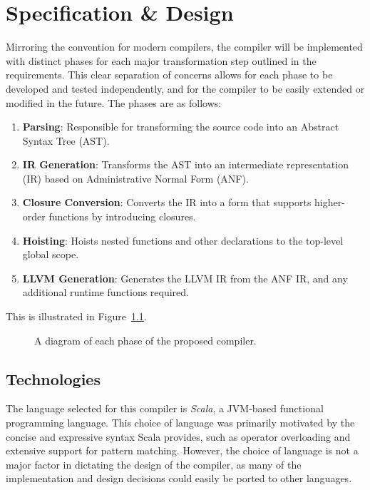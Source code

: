 \chapter{Specification \& Design}
\label{ch:design}

Mirroring the convention for modern compilers, the compiler will be implemented with distinct phases
for each major transformation step outlined in the requirements. This clear separation of concerns
allows for each phase to be developed and tested independently, and for the compiler to be easily
extended or modified in the future. The phases are as follows:

\begin{enumerate}
      \item \textbf{Parsing}: Responsible for transforming the source code into an Abstract Syntax
            Tree (AST).
      \item \textbf{IR Generation}: Transforms the AST into an intermediate representation (IR)
            based on Administrative Normal Form (ANF).
      \item \textbf{Closure Conversion}: Converts the IR into a form that supports higher-order
            functions by introducing closures.
      \item \textbf{Hoisting}: Hoists nested functions and other declarations to the top-level
            global scope.
      \item \textbf{LLVM Generation}: Generates the LLVM IR from the ANF IR, and any additional
            runtime functions required.
\end{enumerate}

This is illustrated in
Figure~\ref{fig:project-compiler-spec}.

\begin{figure}
      \centering
      
      \caption{A diagram of each phase of the proposed compiler.}
      \label{fig:project-compiler-spec}
\end{figure}

\section{Technologies}

The language selected for this compiler is \emph{Scala}, a JVM-based functional programming
language. This choice of language was primarily motivated by the concise and expressive syntax Scala
provides, such as operator overloading and extensive support for pattern matching. However, the
choice of language is not a major factor in dictating the design of the compiler, as many of the
implementation and design decisions could easily be ported to other languages.

